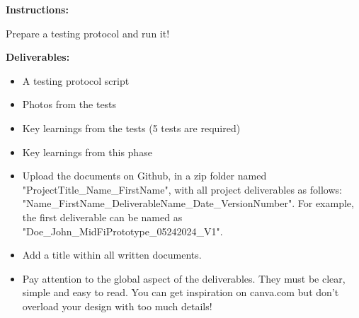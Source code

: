 \makeheaderfiles

\textbf{Instructions:}

Prepare a testing protocol and run it!

\textbf{Deliverables:}

\begin{itemize}
\item A testing protocol script
\item Photos from the tests
\item Key learnings from the tests (5 tests are required)
\item Key learnings from this phase
\item Upload the documents on Github, in a zip folder named "ProjectTitle\_Name\_FirstName", with all project deliverables as follows: "Name\_FirstName\_DeliverableName\_Date\_VersionNumber".  For example, the first deliverable can be named as "Doe\_John\_MidFiPrototype\_05242024\_V1".
\item Add a title within all written documents.
\item Pay attention to the global aspect of the deliverables. They must be clear, simple and easy to read. You can get inspiration on canva.com but don't overload your design with too much details!
\end{itemize}

